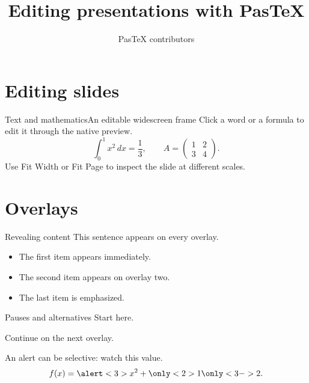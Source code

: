 \documentclass[aspectratio=169]{beamer}
\title{Editing presentations with PasTeX}
\author{PasTeX contributors}
\date{}
\begin{document}
\begin{frame}[plain]
\titlepage
\end{frame}

\section{Editing slides}
\begin{frame}{Text and mathematics}{An editable widescreen frame}
Click a word or a formula to edit it through the native preview.
\[
  \int_0^1 x^2\,dx=\frac{1}{3},
  \qquad A=\begin{pmatrix}1&2\\3&4\end{pmatrix}.
\]
Use Fit Width or Fit Page to inspect the slide at different scales.
\end{frame}

\section{Overlays}
\begin{frame}{Revealing content}
This sentence appears on every overlay.
\begin{itemize}[<+->]
\item The first item appears immediately.
\item The second item appears on overlay two.
\item \alert{The last item is emphasized.}
\end{itemize}
\end{frame}

\begin{frame}{Pauses and alternatives}
Start here.\pause
\par Continue on the next overlay.\pause
\par {}
\par An alert can be selective: \alert<3>{watch this value}.
\[
  f(x)=\alert<3>{x^2}+\only<2>{1}\only<3->{2}.
\]
\end{frame}
\end{document}
